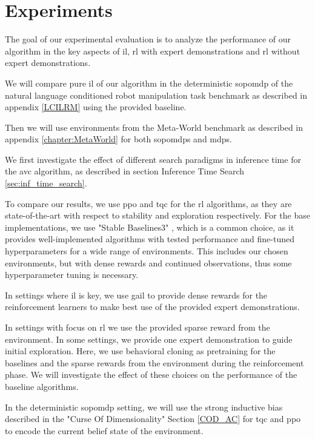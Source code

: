 
\chapter{Experiments}
\label{chapter:Experiments}
The goal of our experimental evaluation is to analyze the performance of our algorithm in the key aspects of 
\ac{il}, \ac{rl} with expert demonstrations and \ac{rl} without expert demonstrations. 

We will compare pure \ac{il} of our algorithm in the deterministic \ac{sopomdp} of the 
natural language conditioned robot manipulation task benchmark as described in appendix \ref{LCILRM} using the provided baseline.

Then we will use environments from the Meta-World benchmark as described in appendix \ref{chapter:MetaWorld} for both \ac{sopomdp}s and \ac{mdp}s.

We first investigate the effect of different search paradigms in inference time for the \ac{avc} algorithm, as described in section Inference Time Search \ref{sec:inf_time_search}.

To compare our results, we use \ac{ppo} and \ac{tqc} for the \ac{rl} algorithms, as they are state-of-the-art with respect to stability and 
exploration respectively. For the base implementations, we use "Stable Baselines3" \cite{stable-baselines3}, which is a common choice, as it provides well-implemented algorithms with tested
performance and fine-tuned hyperparameters for a wide range of environments. This includes our chosen environments, but with dense rewards and continued observations,
thus some hyperparameter tuning is necessary.

In settings where \ac{il} is key, we use \ac{gail} to provide dense rewards for the reinforcement learners to make best use of the provided expert demonstrations.

In settings with focus on \ac{rl} we use the provided sparse reward from the environment. In some settings, we provide one 
expert demonstration to guide initial exploration. Here, we use behavioral cloning as pretraining for the baselines and the sparse rewards from the environment during the reinforcement phase. 
We will investigate the effect of these choices on the performance of the baseline algorithms.

In the deterministic \ac{sopomdp} setting, we will use the strong inductive bias described in the "Curse Of Dimensionality" 
Section \ref{COD_AC} for \ac{tqc} and \ac{ppo} to encode the current belief state of the environment.

